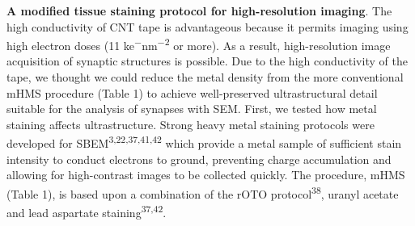 \documentclass{article}
\begin{document}

\textbf{A modified tissue staining protocol for high-resolution imaging}. The high conductivity of CNT tape is advantageous because it permits imaging using high electron doses (11 ke\textsuperscript{−}nm\textsuperscript{−2} or more). As a result, high-resolution image acquisition of synaptic structures is possible. Due to the high conductivity of the tape, we 
thought we could reduce the metal density from the more conventional mHMS procedure (Table 1) to achieve well-preserved ultrastructural detail suitable for the analysis of synapses with SEM. First, we tested how metal staining affects ultrastructure. Strong heavy metal staining protocols were developed for SBEM\textsuperscript{3,22,37,41,42} which provide a metal sample of sufficient stain intensity to conduct electrons to ground, preventing charge accumulation and allowing for high-contrast images to be collected quickly. The procedure, mHMS (Table 1), is based upon a combination of the rOTO protocol\textsuperscript{38}, uranyl acetate and lead aspartate staining\textsuperscript{37,42}.
\end{document}
